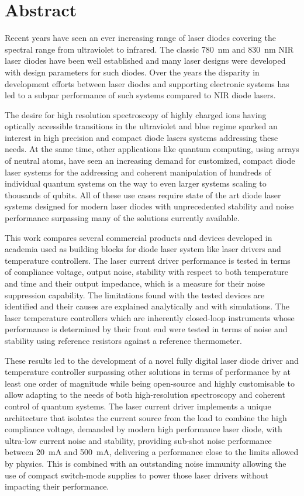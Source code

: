\section*{Abstract}
Recent years have seen an ever increasing range of laser diodes covering the spectral range from ultraviolet to infrared. The classic \qty{780}{\nm} and \qty{830}{\nm} NIR laser diodes have been well established and many laser designs were developed with design parameters for such diodes. Over the years the disparity in development efforts between laser diodes and supporting electronic systems has led to a subpar performance of such systems compared to NIR diode lasers.

The desire for high resolution spectroscopy of highly charged ions having optically accessible transitions in the ultraviolet and blue regime sparked an interest in high precision and compact diode lasers systems addressing these needs. At the same time, other applications like quantum computing, using arrays of neutral atoms, have seen an increasing demand for customized, compact diode laser systems for the addressing and coherent manipulation of hundreds of individual quantum systems on the way to even larger systems scaling to thousands of qubits. All of these use cases require state of the art diode laser systems designed for modern laser diodes with unprecedented stability and noise performance surpassing many of the solutions currently available.

This work compares several commercial products and devices developed in academia used as building blocks for diode laser system like laser drivers and temperature controllers. The laser current driver performance is tested in terms of compliance voltage, output noise, stability with respect to both temperature and time and their output impedance, which is a measure for their noise suppression capability. The limitations found with the tested devices are identified and their causes are explained analytically and with simulations. The laser temperature controllers which are inherently closed-loop instruments whose performance is determined by their front end were tested in terms of noise and stability using reference resistors against a reference thermometer.

These results led to the development of a novel fully digital laser diode driver and temperature controller surpassing other solutions in terms of performance by at least one order of magnitude while being open-source and highly customisable to allow adapting to the needs of both high-resolution spectroscopy and coherent control of quantum systems. The laser current driver implements a unique architecture that isolates the current source from the load to combine the high compliance voltage, demanded by modern high performance laser diode, with ultra-low current noise and stability, providing sub-shot noise performance between \qty{20}{\mA} and \qty{500}{\mA}, delivering a performance close to the limits allowed by physics. This is combined with an outstanding noise immunity allowing the use of compact switch-mode supplies to power those laser drivers without impacting their performance.

